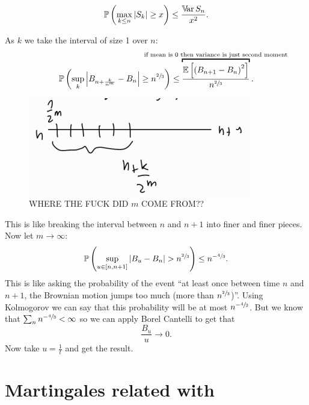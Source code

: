 \documentclass[12pt]{report}
\begin{document}
\begin{enumerate}[\circnum]
\begin{fancyproof}
\begin{revise}
				\begin{equation*}
					\mathbb{P}\left(\max_{k\leq n}|S_{k}|\geq x\right)\leq\frac{\mathbb{V}\!\mathrm{ar}\, S_{n}}{x^{2}}.
				\end{equation*}
			\end{revise}
			As $k$ we take the interval of size 1 over $n$:
			\begin{equation*}
				\pr\left(\sup_{k}\left|B_{n+\frac{k}{n^{m}}}-B_{n}\right|\geq n^{\sfrac{2}{3}}\right)\leq\overbracket{\frac{\evs\left[\left(B_{n+1}-B_{n}\right)^{2}\right]}{n^{\sfrac{2}{3}}}}^{\claptext{if mean is 0 then variance is just second moment}}.
			\end{equation*}
			\begin{figure}[H]
				\centering
				\includegraphics[width=0.5\linewidth]{img/screenshot014}
				\caption{WHERE THE FUCK DID $m$ COME FROM??}
				\label{fig:screenshot014}
			\end{figure}
			This is like breaking the interval between $n$ and $n+1$ into finer and finer pieces.
			Now let $m\to\infty$:
			\begin{equation*}
				\pr\left(\sup_{u\in[n,n+1]}|B_{u}-B_{n}|>n^{\sfrac{2}{3}}\right)\leq n^{-\sfrac{4}{3}}.
			\end{equation*}
			This is like asking the probability of the event ``at least once between time $n$ and $n+1$, the Brownian motion jumps too much (more than $n^{\sfrac{2}{3}}$)''. Using Kolmogorov we can say that this probability will be at most $n^{-\sfrac{4}{3}}$. But we know that $\sum_{n}n^{-\sfrac{4}{3}}<\infty$ so we can apply Borel Cantelli to get that 
			\begin{equation*}
				\frac{B_{u}}{u}\to 0.
			\end{equation*}
			Now take $u=\frac{1}{t}$ and get the result.
	\end{fancyproof}
\end{enumerate}
\section{Martingales related with \bwm}
\end{document}
